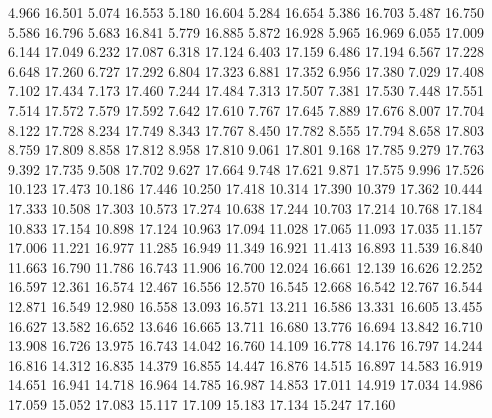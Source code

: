 {         4.966 16.501
         5.074 16.553
         5.180 16.604
         5.284 16.654
         5.386 16.703
         5.487 16.750
         5.586 16.796
         5.683 16.841
         5.779 16.885
         5.872 16.928
         5.965 16.969
         6.055 17.009
         6.144 17.049
         6.232 17.087
         6.318 17.124
         6.403 17.159
         6.486 17.194
         6.567 17.228
         6.648 17.260
         6.727 17.292
         6.804 17.323
         6.881 17.352
         6.956 17.380
         7.029 17.408
         7.102 17.434
         7.173 17.460
         7.244 17.484
         7.313 17.507
         7.381 17.530
         7.448 17.551
         7.514 17.572
         7.579 17.592
         7.642 17.610
         7.767 17.645
         7.889 17.676
         8.007 17.704
         8.122 17.728
         8.234 17.749
         8.343 17.767
         8.450 17.782
         8.555 17.794
         8.658 17.803
         8.759 17.809
         8.858 17.812
         8.958 17.810
         9.061 17.801
         9.168 17.785
         9.279 17.763
         9.392 17.735
         9.508 17.702
         9.627 17.664
         9.748 17.621
         9.871 17.575
         9.996 17.526
        10.123 17.473
        10.186 17.446
        10.250 17.418
        10.314 17.390
        10.379 17.362
        10.444 17.333
        10.508 17.303
        10.573 17.274
        10.638 17.244
        10.703 17.214
        10.768 17.184
        10.833 17.154
        10.898 17.124
        10.963 17.094
        11.028 17.065
        11.093 17.035
        11.157 17.006
        11.221 16.977
        11.285 16.949
        11.349 16.921
        11.413 16.893
        11.539 16.840
        11.663 16.790
        11.786 16.743
        11.906 16.700
        12.024 16.661
        12.139 16.626
        12.252 16.597
        12.361 16.574
        12.467 16.556
        12.570 16.545
        12.668 16.542
        12.767 16.544
        12.871 16.549
        12.980 16.558
        13.093 16.571
        13.211 16.586
        13.331 16.605
        13.455 16.627
        13.582 16.652
        13.646 16.665
        13.711 16.680
        13.776 16.694
        13.842 16.710
        13.908 16.726
        13.975 16.743
        14.042 16.760
        14.109 16.778
        14.176 16.797
        14.244 16.816
        14.312 16.835
        14.379 16.855
        14.447 16.876
        14.515 16.897
        14.583 16.919
        14.651 16.941
        14.718 16.964
        14.785 16.987
        14.853 17.011
        14.919 17.034
        14.986 17.059
        15.052 17.083
        15.117 17.109
        15.183 17.134
        15.247 17.160
}
